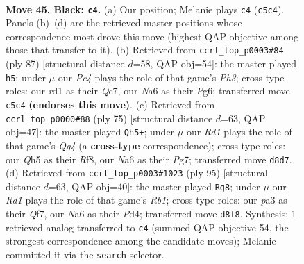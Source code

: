 \documentclass[11pt]{article}
\begin{document}
\clearpage

\begin{figure}[p]\centering
\begin{subfigure}{0.46\textwidth}\centering
\resizebox{\linewidth}{!}{%
\newchessgame
\chessboard[
  setfen={3r2k1/pp6/n2P4/2p1Qp1q/8/P5P1/1P6/R2R1K2 b - - 2 45},
  showmover=false,
  pgfstyle=straightmove, color=movearrow, markmove={c5-c4}
]}
\caption{}
\end{subfigure}\hfill
\begin{subfigure}{0.46\textwidth}\centering
\resizebox{\linewidth}{!}{%
\newchessgame
\chessboard[
  setfen={6k1/2q2p2/6pp/3Q4/1p5P/1P3RP1/4rP1K/8 b - - 0 44},
  showmover=false,
  pgfstyle=straightmove, color=movearrow, markmove={h6-h5}
]}
\caption{}
\end{subfigure}
\\[4pt]
\begin{subfigure}{0.46\textwidth}\centering
\resizebox{\linewidth}{!}{%
\newchessgame
\chessboard[
  setfen={5r2/1p4pk/p7/P2QP1q1/8/1PP2R1K/7P/8 b - - 0 38},
  showmover=false,
  pgfstyle=straightmove, color=movearrow, markmove={g5-h5}
]}
\caption{}
\end{subfigure}\hfill
\begin{subfigure}{0.46\textwidth}\centering
\resizebox{\linewidth}{!}{%
\newchessgame
\chessboard[
  setfen={1r5k/5q1p/7p/1PP5/3pb3/Q1n4P/1R4P1/4R1K1 b - - 0 48},
  showmover=false,
  pgfstyle=straightmove, color=movearrow, markmove={b8-g8}
]}
\caption{}
\end{subfigure}
\caption{\textbf{Move 45, Black: \texttt{c4}.} (a) Our position; Melanie plays \texttt{c4} (\texttt{c5c4}). Panels (b)--(d) are the retrieved master positions whose correspondence most drove this move (highest QAP objective among those that transfer to it). (b) Retrieved from \texttt{ccrl\_top\_p0003\#84} (ply 87) [structural distance $d$=58, QAP obj=54]: the master played \texttt{h5}; under $\mu$ our \emph{Pc4} plays the role of that game's \emph{Ph3}; cross-type roles: our \emph{r}d1 as their \emph{Q}c7, our \emph{N}a6 as their \emph{P}g6; transferred move \texttt{c5c4} \textbf{(endorses this move)}. (c) Retrieved from \texttt{ccrl\_top\_p0000\#88} (ply 75) [structural distance $d$=63, QAP obj=47]: the master played \texttt{Qh5+}; under $\mu$ our \emph{Rd1} plays the role of that game's \emph{Qg4} (a \textbf{cross-type} correspondence); cross-type roles: our \emph{Q}h5 as their \emph{R}f8, our \emph{N}a6 as their \emph{P}g7; transferred move \texttt{d8d7}. (d) Retrieved from \texttt{ccrl\_top\_p0003\#1023} (ply 95) [structural distance $d$=63, QAP obj=40]: the master played \texttt{Rg8}; under $\mu$ our \emph{Rd1} plays the role of that game's \emph{Rb1}; cross-type roles: our \emph{p}a3 as their \emph{Q}f7, our \emph{N}a6 as their \emph{P}d4; transferred move \texttt{d8f8}. Synthesis: 1 retrieved analog transferred to \texttt{c4} (summed QAP objective 54, the strongest correspondence among the candidate moves); Melanie committed it via the \texttt{search} selector.}
\label{fig:thought-m89}
\end{figure}
\end{document}
